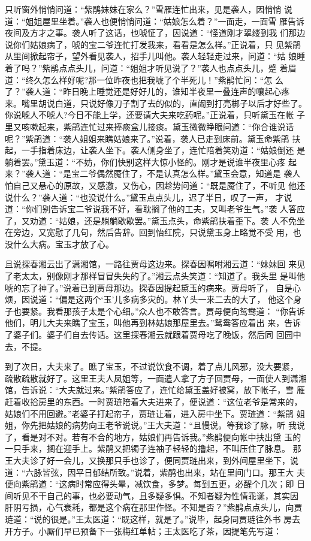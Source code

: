 只听窗外悄悄问道：“紫鹃妹妹在家么？”雪雁连忙出来，见是袭人，因悄悄
说道：“姐姐屋里坐着。”袭人也便悄悄问道：“姑娘怎么着？”一面走，一面雪
雁告诉夜间及方才之事。袭人听了这话，也唬怔了，因说道：“怪道刚才翠缕到我
们那边说你们姑娘病了，唬的宝二爷连忙打发我来，看看是怎么样。”正说着，只
见紫鹃从里间掀起帘子，望外看见袭人，招手儿叫他。袭人轻轻走过来，问道：“姑
娘睡着了吗？”紫鹃点点头儿，问道：“姐姐才听见说了？”袭人也点点头儿，蹙
着眉道：“终久怎么样好呢?那一位昨夜也把我唬了个半死儿！”紫鹃忙问：“怎
么了？”袭人道：“昨日晚上睡觉还是好好儿的，谁知半夜里一叠连声的嚷起心疼
来。嘴里胡说白道，只说好像刀子割了去的似的，直闹到打亮梆子以后才好些了。
你说唬人不唬人?今日不能上学，还要请大夫来吃药呢。”正说着，只听黛玉在帐
子里又咳嗽起来，紫鹃连忙过来捧痰盒儿接痰。黛玉微微睁眼问道：“你合谁说话
呢？”紫鹃道：“袭人姐姐来瞧姑娘来了。”说着，袭人已走到床前。黛玉命紫鹃
扶起，一手指着床边，让袭人坐下。袭人侧身坐了，连忙陪着笑劝道：“姑娘倒还
是躺着罢。”黛玉道：“不妨，你们快别这样大惊小怪的。刚才是说谁半夜里心疼
起来？”袭人道：“是宝二爷偶然魇住了，不是认真怎么样。”黛玉会意，知道是
袭人怕自己又悬心的原故，又感激，又伤心，因趁势问道：“既是魇住了，不听见
他还说什么？”袭人道：“也没说什么。”黛玉点点头儿，迟了半日，叹了一声，
才说道：“你们别告诉宝二爷说我不好，看耽搁了他的工夫，又叫老爷生气。”袭
人答应了，又劝道：“姑娘，还是躺躺歇歇罢。”黛玉点头，命紫鹃扶着歪下。袭
人不免坐在旁边，又宽慰了几句，然后告辞。回到怡红院，只说黛玉身上略觉不受
用，也没什么大病。宝玉才放了心。

且说探春湘云出了潇湘馆，一路往贾母这边来。探春因嘱咐湘云道：“妹妹回
来见了老太太，别像刚才那样冒冒失失的了。”湘云点头笑道：“知道了。我头里
是叫他唬的忘了神了。”说着已到贾母那边。探春因提起黛玉的病来。贾母听了，
自是心烦，因说道：“偏是这两个‘玉’儿多病多灾的。林丫头一来二去的大了，
他这个身子也要紧。我看那孩子太是个心细。”众人也不敢答言。贾母便向鸳鸯道：
“你告诉他们，明儿大夫来瞧了宝玉，叫他再到林姑娘那屋里去。”鸳鸯答应着出
来，告诉了婆子们。婆子们自去传话。这里探春湘云就跟着贾母吃了晚饭，然后同
回园中去，不提。

到了次日，大夫来了。瞧了宝玉，不过说饮食不调，着了点儿风邪，没大要紧，
疏散疏散就好了。这里王夫人凤姐等，一面遣人拿了方子回贾母，一面使人到潇湘
馆，告诉说：“大夫就过来。”紫鹃答应了，连忙给黛玉盖好被窝，放下帐子，雪
雁赶着收拾房里的东西。一时贾琏陪着大夫进来了，便说道：“这位老爷是常来的，
姑娘们不用回避。”老婆子打起帘子，贾琏让着，进入房中坐下。贾琏道：“紫鹃
姐姐，你先把姑娘的病势向王老爷说说。”王大夫道：“且慢说。等我诊了脉，听
我说了，看是对不对。若有不合的地方，姑娘们再告诉我。”紫鹃便向帐中扶出黛
玉的一只手来，搁在迎手上。紫鹃又把镯子连袖子轻轻的撸起，不叫压住了脉息。
那王大夫诊了好一会儿，又换那只手也诊了，便同贾琏出来，到外间屋里坐下，说
道：“六脉皆弦，因平日郁结所致。”说着，紫鹃也出来，站在里间门口。那王大
夫便向紫鹃道：“这病时常应得头晕，减饮食，多梦。每到五更，必醒个几次；即
日间听见不干自己的事，也必要动气，且多疑多惧。不知者疑为性情乖诞，其实因
肝阴亏损，心气衰耗，都是这个病在那里作怪。不知是否？”紫鹃点点头儿，向贾
琏道：“说的很是。”王太医道：“既这样，就是了。”说毕，起身同贾琏往外书
房去开方子。小厮们早已预备下一张梅红单帖；王太医吃了茶，因提笔先写道：

